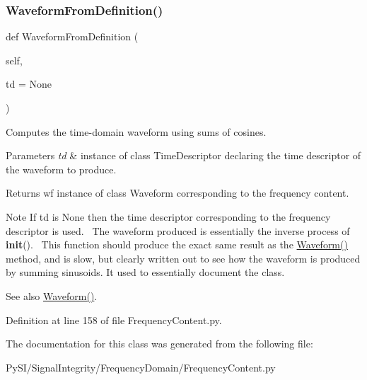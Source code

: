 \subsubsection{\texorpdfstring{Waveform\+From\+Definition()}{WaveformFromDefinition()}}
{\footnotesize\ttfamily def Waveform\+From\+Definition (\begin{DoxyParamCaption}\item[{}]{self,  }\item[{}]{td = {\ttfamily None} }\end{DoxyParamCaption})}



Computes the time-\/domain waveform using sums of cosines. 


\begin{DoxyParams}{Parameters}
{\em td} & instance of class Time\+Descriptor declaring the time descriptor of the waveform to produce. \\
\hline
\end{DoxyParams}
\begin{DoxyReturn}{Returns}
wf instance of class Waveform corresponding to the frequency content. 
\end{DoxyReturn}
\begin{DoxyNote}{Note}
If td is None then the time descriptor corresponding to the frequency descriptor is used.~\newline
 The waveform produced is essentially the inverse process of {\bfseries init}().~\newline
 This function should produce the exact same result as the \hyperlink{classSignalIntegrity_1_1FrequencyDomain_1_1FrequencyContent_1_1FrequencyContent_af833a7687c414346de1e2ffab6b47d5c}{Waveform()} method, and is slow, but clearly written out to see how the waveform is produced by summing sinusoids. It used to essentially document the class.~\newline
 
\end{DoxyNote}
\begin{DoxySeeAlso}{See also}
\hyperlink{classSignalIntegrity_1_1FrequencyDomain_1_1FrequencyContent_1_1FrequencyContent_af833a7687c414346de1e2ffab6b47d5c}{Waveform()}. 
\end{DoxySeeAlso}


Definition at line 158 of file Frequency\+Content.\+py.



The documentation for this class was generated from the following file\+:\begin{DoxyCompactItemize}
\item 
Py\+S\+I/\+Signal\+Integrity/\+Frequency\+Domain/Frequency\+Content.\+py\end{DoxyCompactItemize}
